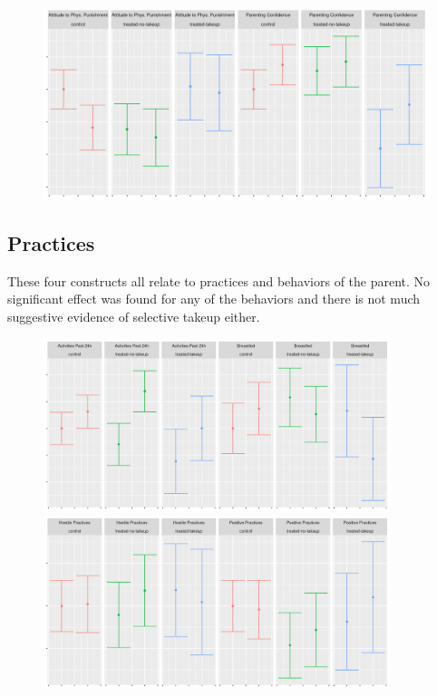 \documentclass{article}
\begin{document}

\begin{figure}[H]
  \centering
\includegraphics[width=\textwidth]{plots/pre_post/Parenting Confidence.png}
\end{figure}


\subsection*{Practices}

These four constructs all relate to practices and behaviors of the parent. No significant effect was found for any of the behaviors and there is not much suggestive evidence of selective takeup either.



\begin{figure}[H]
  \centering
\includegraphics[width=0.9\textwidth]{plots/pre_post/Breastfed.png}
\includegraphics[width=0.9\textwidth]{plots/pre_post/Positive Practices.png}

\end{figure}
\end{document}
